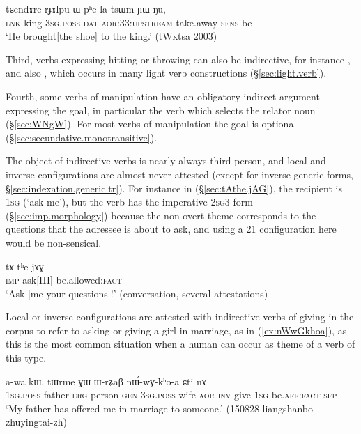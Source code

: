 \begin{exe}
	\ex \label{ex:Wphe.latsWm}
	\gll  tɕendɤre rɟɤlpu ɯ-pʰe la-tsɯm ɲɯ-ŋu,  \\
	\textsc{lnk}  king \textsc{3sg}.\textsc{poss}-\textsc{dat} \textsc{aor}:3\fl{}3:\textsc{upstream}-take.away \textsc{sens}-be \\
	\glt `He brought[the shoe] to the king.'  (tWxtsa 2003)
\end{exe}

Third, verbs expressing hitting or throwing can also be indirective, for instance , and also , which occurs in many light verb constructions (§\ref{sec:light.verb}).

Fourth, some verbs of manipulation have an obligatory indirect argument expressing the goal, in particular the verb  which selects the relator noun  (§\ref{sec:WNgW}). For most verbs of manipulation the goal is optional  (§\ref{sec:secundative.monotransitive}).

The object of indirective verbs is nearly always third person, and local and inverse configurations are almost never attested (except for inverse generic forms, §\ref{sec:indexation.generic.tr}). For instance in (§\ref{sec:tAthe.jAG}), the recipient is \textsc{1sg} (`ask me'), but the verb  has the imperative \textsc{2sg}\fl{}3 form (§\ref{sec:imp.morphology}) because the non-overt theme corresponds to the questions that the adressee is about to ask, and using a 2\fl{}1 configuration here would be non-sensical.

\begin{exe}
	\ex \label{sec:tAthe.jAG}
	\gll  tɤ-tʰe jɤɣ \\
	\textsc{imp}-ask[III] be.allowed:\textsc{fact} \\
	\glt `Ask [me your questions]!' (conversation, several attestations)
\end{exe}

Local or inverse configurations are attested with indirective verbs of giving in the corpus to refer to asking or giving a girl in marriage, as in (\ref{ex:nWwGkhoa}), as this is the most common situation when a human can occur as theme of a verb of this type.

\begin{exe}
	\ex \label{ex:nWwGkhoa}
	\gll  a-wa kɯ, tɯrme ɣɯ ɯ-rʑaβ nɯ́-wɣ-kʰo-a ɕti nɤ \\
	\textsc{1sg}.\textsc{poss}-father \textsc{erg} person \textsc{gen} \textsc{3sg}.\textsc{poss}-wife \textsc{aor}-\textsc{inv}-give-\textsc{1sg} be.\textsc{aff}:\textsc{fact} \textsc{sfp} \\
	\glt `My father has offered me in marriage to someone.' (150828 liangshanbo zhuyingtai-zh)
\end{exe}

